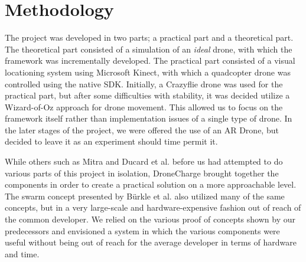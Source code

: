 \section{Methodology}
The project was developed in two parts; a practical part and a theoretical part. The theoretical part consisted of a simulation of an \textit{ideal} drone, with which the framework was incrementally developed. The practical part consisted of a visual locationing system using Microsoft Kinect, with which a quadcopter drone was controlled using the native SDK. Initially, a Crazyflie drone was used for the practical part, but after some difficulties with stability, it was decided utilize a Wizard-of-Oz approach for drone movement. This allowed us to focus on the framework itself rather than implementation issues of a single type of drone.	In the later stages of the project, we were offered the use of an AR Drone, but decided to leave it as an experiment should time permit it.

While others such as Mitra and Ducard et al. before us had attempted to do various parts of this project in isolation, DroneCharge brought together the components in order to create a practical solution on a more approachable level. The swarm concept presented by B\"urkle et al. also utilized many of the same concepts, but in a very large-scale and hardware-expensive fashion out of reach of the common developer. We relied on the various proof of concepts shown by our predecessors and envisioned a system in which the various components were useful without being out of reach for the average developer in terms of hardware and time.